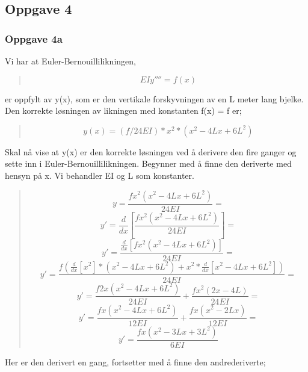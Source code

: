 \subsection{Oppgave 4}
\subsubsection{Oppgave 4a}
Vi har at Euler-Bernouillilikningen,
\begin{quote}
\begin{equation}
EIy'''' = f(x)
\end{equation}
\end{quote}
er oppfylt av y(x), som er den vertikale forskyvningen av en L meter lang bjelke. Den korrekte løsningen av likningen med konstanten f(x) = f er;
\begin{quote}
\begin{equation}
y(x)=(f/24EI)*x^2*(x^2-4Lx+6L^2)
\end{equation}
\end{quote}
Skal nå vise at y(x) er den korrekte løsningen ved å derivere den fire ganger og sette inn i Euler-Bernouillilikningen. Begynner med å finne den deriverte med hensyn på x. Vi behandler EI og L som konstanter.
\begin{quote}
\begin{equation*}
y=\frac{fx^2(x^2-4Lx+6L^2)}{24EI}=
\end{equation*}
\begin{equation*}
y'=\frac{d}{dx}[\frac{fx^2(x^2-4Lx+6L^2)}{24EI}]=
\end{equation*}
\begin{equation*}
y'=\frac{\frac{d}{dx}[fx^2(x^2-4Lx+6L^2)]}{24EI}=
\end{equation*}
\begin{equation*}
y'=\frac{f(\frac{d}{dx}[x^2]*(x^2-4Lx+6L^2) + x^2*\frac{d}{dx}[x^2-4Lx+6L^2])}{24EI}=
\end{equation*}
\begin{equation*}
y'=\frac{f2x(x^2-4Lx+6L^2)}{24EI}+\frac{fx^2(2x-4L)}{24EI}=
\end{equation*}
\begin{equation*}
y'=\frac{fx(x^2-4Lx+6L^2)}{12EI}+\frac{fx(x^2-2Lx)}{12EI}=
\end{equation*}
\begin{equation*}
y'=\frac{fx(x^2-3Lx+3L^2)}{6EI}
\end{equation*}
\end{quote}
Her er den derivert en gang, fortsetter med å finne den andrederiverte;
